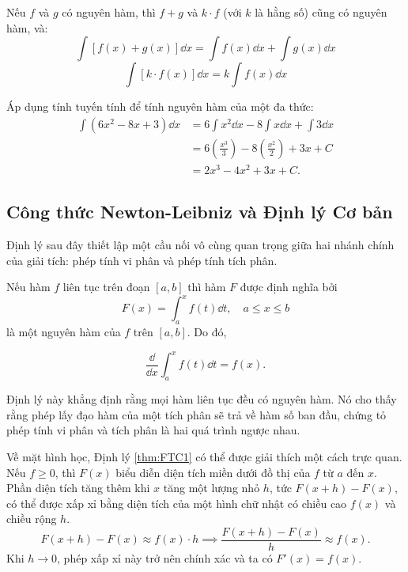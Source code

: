 \begin{proposition}
    Nếu $f$ và $g$ có nguyên hàm, thì $f+g$ và $k \cdot f$ (với $k$ là hằng số) cũng có nguyên hàm, và:
    \[ \int [f(x) + g(x)] \dd x = \int f(x) \dd x + \int g(x) \dd x \]
    \[ \int [k \cdot f(x)] \dd x = k \int f(x) \dd x \]
\end{proposition}

\begin{example}
    Áp dụng tính tuyến tính để tính nguyên hàm của một đa thức:
    \begin{align*}
        \int (6x^2 - 8x + 3) \dd x &= 6 \int x^2 \dd x - 8 \int x \dd x + \int 3 \dd x \\
        &= 6 \left(\frac{x^3}{3}\right) - 8 \left(\frac{x^2}{2}\right) + 3x + C \\
        &= 2x^3 - 4x^2 + 3x + C.
    \end{align*}
\end{example}

\subsection{Công thức Newton-Leibniz và Định lý Cơ bản}

Định lý sau đây thiết lập một cầu nối vô cùng quan trọng giữa hai nhánh chính của giải tích: phép tính vi phân và phép tính tích phân.

\begin{theorem} \label{thm:FTC1}
    Nếu hàm $f$ liên tục trên đoạn $[a, b]$ thì hàm $F$ được định nghĩa bởi
    \[ F(x) = \int_{a}^{x} f(t) \dd t, \quad a \le x \le b \]
    là một nguyên hàm của $f$ trên $[a,b]$. Do đó,
    \begin{importantbox}
        \[ \dfrac{\dd}{\dd x} \int_{a}^{x} f(t) \dd t = f(x). \]
    \end{importantbox}
\end{theorem}

Định lý này khẳng định rằng mọi hàm liên tục đều có nguyên hàm. Nó cho thấy rằng phép lấy đạo hàm của một tích phân sẽ trả về hàm số ban đầu, chứng tỏ phép tính vi phân và tích phân là hai quá trình ngược nhau.

Về mặt hình học, Định lý \ref{thm:FTC1} có thể được giải thích một cách trực quan. Nếu $f \ge 0$, thì $F(x)$ biểu diễn diện tích miền dưới đồ thị của $f$ từ $a$ đến $x$. Phần diện tích tăng thêm khi $x$ tăng một lượng nhỏ $h$, tức $F(x+h) - F(x)$, có thể được xấp xỉ bằng diện tích của một hình chữ nhật có chiều cao $f(x)$ và chiều rộng $h$.
\[ F(x+h) - F(x) \approx f(x) \cdot h \implies \dfrac{F(x+h) - F(x)}{h} \approx f(x). \]
Khi $h \to 0$, phép xấp xỉ này trở nên chính xác và ta có $F'(x) = f(x)$.

